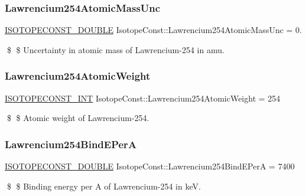 \subsubsection{\texorpdfstring{Lawrencium254\+Atomic\+Mass\+Unc}{Lawrencium254AtomicMassUnc}}
{\footnotesize\ttfamily \mbox{\hyperlink{group___isotope_const-_macros_ga8f45a7272ce02c0b4c65c44636ed719a}{I\+S\+O\+T\+O\+P\+E\+C\+O\+N\+S\+T\+\_\+\+D\+O\+U\+B\+LE}} Isotope\+Const\+::\+Lawrencium254\+Atomic\+Mass\+Unc = 0.}

\$ \$ Uncertainty in atomic mass of Lawrencium-\/254 in amu. \mbox{\label{group___isotope_const-_lawrencium-_lr254_gadc378edae844b30ab45adffb8c982381}} 
\subsubsection{\texorpdfstring{Lawrencium254\+Atomic\+Weight}{Lawrencium254AtomicWeight}}
{\footnotesize\ttfamily \mbox{\hyperlink{group___isotope_const-_macros_ga5f18360b3e99483a35c32d789e62621c}{I\+S\+O\+T\+O\+P\+E\+C\+O\+N\+S\+T\+\_\+\+I\+NT}} Isotope\+Const\+::\+Lawrencium254\+Atomic\+Weight = 254}

\$ \$ Atomic weight of Lawrencium-\/254. \mbox{\label{group___isotope_const-_lawrencium-_lr254_ga001532d1fe58550c3e4186fbf33ece34}} 
\subsubsection{\texorpdfstring{Lawrencium254\+Bind\+E\+PerA}{Lawrencium254BindEPerA}}
{\footnotesize\ttfamily \mbox{\hyperlink{group___isotope_const-_macros_ga8f45a7272ce02c0b4c65c44636ed719a}{I\+S\+O\+T\+O\+P\+E\+C\+O\+N\+S\+T\+\_\+\+D\+O\+U\+B\+LE}} Isotope\+Const\+::\+Lawrencium254\+Bind\+E\+PerA = 7400}

\$ \$ Binding energy per A of Lawrencium-\/254 in keV. \mbox{\label{group___isotope_const-_lawrencium-_lr254_gac13fab1feb31085fa0593fff3cb6f21a}} 
